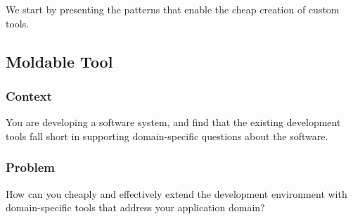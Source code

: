 \documentclass[sigconf]{acmart}
\renewcommand{\nbc}[3]{} %
\newcommand\tg[1]{\nbc{TG}{#1}{blue}}
\newcommand\rb[1]{\nbc{Ralf}{#1}{teal}}
\newcommand\wc[1]{\nbc{Ward}{#1}{teal}}
\newcommand\kh[1]{\nbc{Konrad}{#1}{violet}}
\begin{document}
We start by presenting the patterns that enable the cheap creation of custom tools.

\rb{Lots of folks like to compose patterns with a template. On wiki Ward suggested two paragraphs separated by the word "Therefore" was sufficient so long as the first paragraph described a recurring problem with roots in human nature, and the second paragraph described something specific you could make or do that "resolves" the forces present in the first paragraph. I might have referred to this as Patlets once or twice.}

\wc{Each statement describes how or where to apply a solution without explaining
what human need causes these solutions to be routinely required. We were led
to believe that an ability to make decisions is the root of each need. I will be
looking for ways to understand this decision making better and to tie human
decision making to the solutions offered by each pattern.}

\subsection*{Moldable Tool}\label{pat:moldableTool}


\kh{My main criticism of the overall approach of presenting patterns is that
some of them aren't really patterns. For me, a pattern is something that
has been repeatedly observed in practice. The very first pattern you
present, "Moldable Tool", probably isn't a pattern. How many moldable
tools have been developed? I know of one.}

\subsubsection*{Context}
You are developing a software system, and find that the existing development tools fall short in supporting domain-specific questions about the software.

\subsubsection*{Problem}
How can you cheaply and effectively extend the development environment with domain-specific tools that address your application domain?
\end{document}
